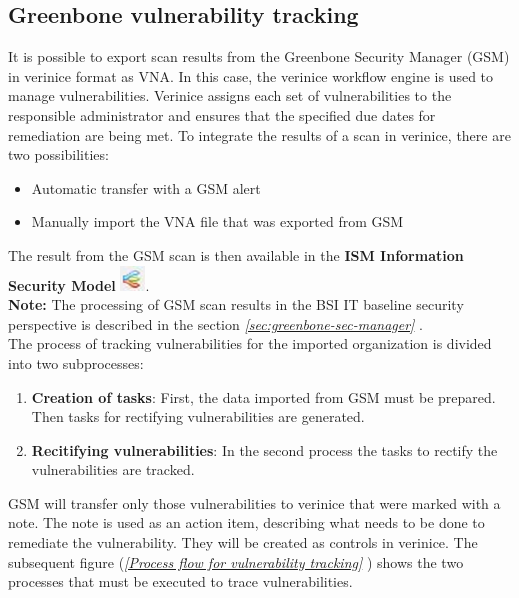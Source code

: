 \documentclass[a4paper,10pt]{book}
\begin{document}
\subsection{Greenbone vulnerability tracking} \label{Greenbone vulnerability tracking}
It is possible to export scan results from the Greenbone Security Manager (GSM) in verinice format as VNA.
In this case, the verinice workflow engine is used to manage vulnerabilities. Verinice assigns each set of vulnerabilities to the responsible administrator and ensures that the specified due dates for remediation are being met.
To integrate the results of a scan in verinice, there are two possibilities:
 \begin{itemize}
 \item Automatic transfer with a GSM alert
 \item Manually import the VNA file that was exported from GSM
\end{itemize}
The result from the GSM scan is then available in the \textbf{ISM Information Security Model} \includegraphics[height=2ex]{Icon/Informationssicherheitsmodell.png}.
\newline\\
\textbf{Note:} The processing of GSM scan results in the BSI IT baseline security perspective is described in the section {\em \ref{sec:greenbone-sec-manager} }.
\newline\\
The process of tracking vulnerabilities for the imported organization is divided into two subprocesses:
\begin{enumerate}
 \item \textbf{Creation of tasks}: First, the data imported from GSM must be prepared. Then tasks for rectifying vulnerabilities are generated.
 \item \textbf{Recitifying vulnerabilities}: In the second process the tasks to rectify the vulnerabilities are tracked.
\end{enumerate}
GSM will transfer only those vulnerabilities to verinice that were marked with a note. The note is used as an action item, describing what needs to be done to remediate the vulnerability. They will be created as controls in verinice.
The subsequent figure ({\em \ref{Process flow for vulnerability tracking} }) shows the two processes that must be executed to trace vulnerabilities.
\end{document}
